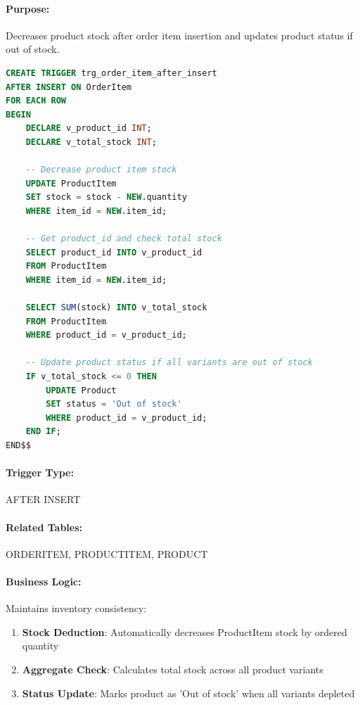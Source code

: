 \paragraph{Purpose:} Decreases product stock after order item insertion and updates product status if out of stock.

\begin{lstlisting}[language=SQL, caption=Trigger: trg\_order\_item\_after\_insert, label=lst:trg_order_item_after]
CREATE TRIGGER trg_order_item_after_insert
AFTER INSERT ON OrderItem
FOR EACH ROW
BEGIN
    DECLARE v_product_id INT;
    DECLARE v_total_stock INT;
    
    -- Decrease product item stock
    UPDATE ProductItem
    SET stock = stock - NEW.quantity
    WHERE item_id = NEW.item_id;
    
    -- Get product_id and check total stock
    SELECT product_id INTO v_product_id
    FROM ProductItem
    WHERE item_id = NEW.item_id;
    
    SELECT SUM(stock) INTO v_total_stock
    FROM ProductItem
    WHERE product_id = v_product_id;
    
    -- Update product status if all variants are out of stock
    IF v_total_stock <= 0 THEN
        UPDATE Product
        SET status = 'Out of stock'
        WHERE product_id = v_product_id;
    END IF;
END$$
\end{lstlisting}

\paragraph{Trigger Type:} AFTER INSERT

\paragraph{Related Tables:} ORDERITEM, PRODUCTITEM, PRODUCT

\paragraph{Business Logic:}
Maintains inventory consistency:
\begin{enumerate}
    \item \textbf{Stock Deduction}: Automatically decreases ProductItem stock by ordered quantity
    \item \textbf{Aggregate Check}: Calculates total stock across all product variants
    \item \textbf{Status Update}: Marks product as 'Out of stock' when all variants depleted
\end{enumerate}

